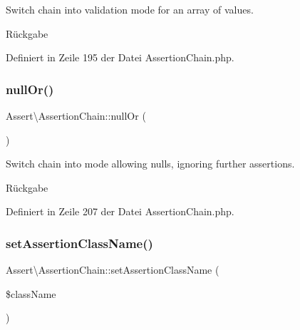 Switch chain into validation mode for an array of values.

\begin{DoxyReturn}{Rückgabe}

\end{DoxyReturn}


Definiert in Zeile 195 der Datei Assertion\+Chain.\+php.

\mbox{\label{class_assert_1_1_assertion_chain_a2878fa5f9807b8bcdd1d9f214cbd91a4}} 
\subsubsection{\texorpdfstring{null\+Or()}{nullOr()}}
{\footnotesize\ttfamily Assert\textbackslash{}\+Assertion\+Chain\+::null\+Or (\begin{DoxyParamCaption}{ }\end{DoxyParamCaption})}

Switch chain into mode allowing nulls, ignoring further assertions.

\begin{DoxyReturn}{Rückgabe}

\end{DoxyReturn}


Definiert in Zeile 207 der Datei Assertion\+Chain.\+php.

\mbox{\label{class_assert_1_1_assertion_chain_a178d218f383d9a06310dab487f20b633}} 
\subsubsection{\texorpdfstring{set\+Assertion\+Class\+Name()}{setAssertionClassName()}}
{\footnotesize\ttfamily Assert\textbackslash{}\+Assertion\+Chain\+::set\+Assertion\+Class\+Name (\begin{DoxyParamCaption}\item[{}]{\$class\+Name }\end{DoxyParamCaption})}


